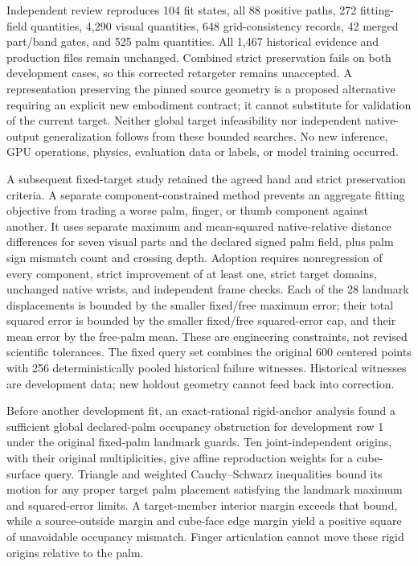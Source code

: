 \documentclass[10pt,letterpaper]{article}
\begin{document}
Independent review reproduces 104 fit states, all 88 positive paths,
272 fitting-field quantities, 4,290 visual quantities, 648 grid-consistency
records, 42 merged part/band gates, and 525 palm quantities. All 1,467
historical evidence and production files remain unchanged. Combined strict
preservation fails on both development cases, so this corrected retargeter
remains unaccepted. A representation preserving the pinned source geometry
is a proposed alternative requiring an explicit new embodiment contract;
it cannot substitute for validation of the current target. Neither global
target infeasibility nor independent native-output generalization follows
from these bounded searches. No new inference, GPU operations, physics,
evaluation data or labels, or model training occurred.


A subsequent fixed-target study retained the agreed hand and strict preservation
criteria. A separate component-constrained method prevents an aggregate fitting
objective from trading a worse palm, finger, or thumb component against another.
It uses separate maximum and mean-squared native-relative distance differences
for seven visual parts and the declared signed palm field, plus palm sign mismatch
count and crossing depth. Adoption requires nonregression of every component,
strict improvement of at least one, strict target domains, unchanged native
wrists, and independent frame checks. Each of the 28 landmark displacements is bounded by the smaller fixed/free
maximum error; their total squared error is bounded by the smaller fixed/free
squared-error cap, and their mean error by the free-palm mean. These are engineering constraints, not revised scientific
tolerances. The fixed query set combines the original 600 centered points with
256 deterministically pooled historical failure witnesses. Historical witnesses
are development data; new holdout geometry cannot feed back into correction.

Before another development fit, an exact-rational rigid-anchor analysis found a
sufficient global declared-palm occupancy obstruction for development row 1
under the original fixed-palm landmark guards. Ten joint-independent origins,
with their original multiplicities, give affine reproduction weights for a
cube-surface query. Triangle and weighted Cauchy--Schwarz inequalities bound its
motion for any proper target palm placement satisfying the landmark maximum and
squared-error limits. A target-member interior margin exceeds that bound, while
a source-outside margin and cube-face edge margin yield a positive square of
unavoidable occupancy mismatch. Finger articulation cannot move these rigid
origins relative to the palm.
\end{document}
